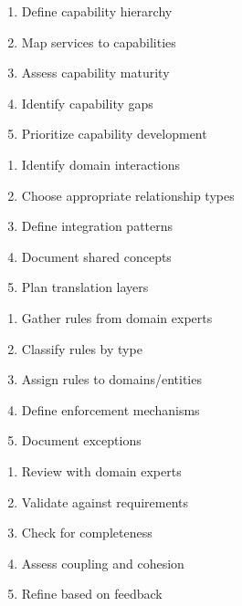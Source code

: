 \documentclass[11pt,letterpaper]{article}
\begin{document}
\begin{guidancebox}
\begin{enumerate}[nosep]
    \item Define capability hierarchy
    \item Map services to capabilities
    \item Assess capability maturity
    \item Identify capability gaps
    \item Prioritize capability development
\end{enumerate}
\end{guidancebox}

\begin{guidancebox}
\begin{enumerate}[nosep]
    \item Identify domain interactions
    \item Choose appropriate relationship types
    \item Define integration patterns
    \item Document shared concepts
    \item Plan translation layers
\end{enumerate}
\end{guidancebox}

\begin{guidancebox}
\begin{enumerate}[nosep]
    \item Gather rules from domain experts
    \item Classify rules by type
    \item Assign rules to domains/entities
    \item Define enforcement mechanisms
    \item Document exceptions
\end{enumerate}
\end{guidancebox}

\begin{guidancebox}
\begin{enumerate}[nosep]
    \item Review with domain experts
    \item Validate against requirements
    \item Check for completeness
    \item Assess coupling and cohesion
    \item Refine based on feedback
\end{enumerate}
\end{guidancebox}
\end{document}

